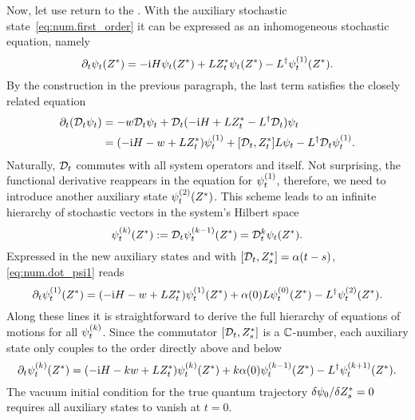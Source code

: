 Now, let use return to the {\NMSSE}.
With the auxiliary stochastic state~\ref{eq:num.first_order} it can be expressed as an inhomogeneous stochastic equation, namely
\begin{equation*}
  \partial_t \psitZ = -\ii\Hsys\psitZ + L\ZZ_t\psitZ - \adj{L}\psitZ[1].
\end{equation*}
By the construction in the previous paragraph, the last term satisfies the closely related equation
\begin{align}
  \partial_t (\adjZZ_t \psi_t) &= - w \adjZZ_t\psi_t + \adjZZ_t ( -\ii\Hsys + L\ZZ_t - \adj{L} \adjZZ_t ) \psi_t \nonumber \\
  &= (-\ii\Hsys - w + L\ZZ_t) \psit[1] + [\adjZZ_t, \ZZ_t] L\psit - \adj{L} \adjZZ_t \psit[1].
  \label{eq:num.dot_psi1}
\end{align}
Naturally, $\mathcal{D}_t$ commutes with all system operators and itself.
Not surprising, the functional derivative reappears in the equation for $\psit[1]$, therefore, we need to introduce another auxiliary state $\psitZ[2]$.
This scheme leads to an infinite hierarchy of stochastic vectors in the system's Hilbert space
\begin{equation}
  \psitZ[k] := \adjZZ_t \psitZ[k-1] = \adjZZ_t^k \psitZ.
  \label{eq:num.auxiliary_states}
\end{equation}
Expressed in the new auxiliary states and with $[\mathcal{D}_t, {Z}^*_s] = \alpha(t-s)$, \autoref{eq:num.dot_psi1} reads
\begin{equation*}
  \partial_t \psitZ[1] = (-\ii\Hsys - w + L\ZZ_t) \psitZ[1] + \alpha(0) L\psitZ[0] - \adj{L}\psitZ[2].
\end{equation*}
Along these lines it is straightforward to derive the full hierarchy of equations of motions for all $\psit[k]$.
Since the commutator $[\mathcal{D}_t, {Z}^*_s]$ is a $\mathbb{C}$-number, each auxiliary state only couples to the order directly above and below
\begin{equation}
  \partial_t\psitZ[k] = (-\ii\Hsys - kw + L\ZZ_t)\psitZ[k] + k \alpha(0) \psitZ[k-1] - \adj{L} \psitZ[k+1].
  \label{eq:num.hierarchy_lin}
\end{equation}
The vacuum initial condition for the true quantum trajectory $\delta \psi_0 / \delta {Z}^*_s = 0$ requires all auxiliary states to vanish at $t=0$.


